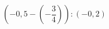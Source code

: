 \begin{ex}[type=calculate]
	\begin{condition}
		\( \left( -0,5-\left( -\dfrac{3}{4} \right) \right):(-0,2) \)
	\end{condition}
	\answer{}
\end{ex}